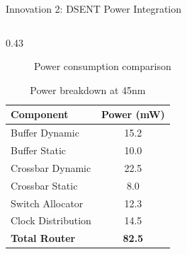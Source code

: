 \documentclass[10pt,aspectratio=169]{beamer}
\begin{document}
\begin{frame}[fragile]{Innovation 2: DSENT Power Integration}
\begin{columns}[T]
\begin{column}{0.43\textwidth}
\begin{figure}
                \caption{Power consumption comparison}
            \end{figure}
            
            \begin{table}[h]
                \centering
                \tiny
                \begin{tabular}{|l|c|}
                    \hline
                    \textbf{Component} & \textbf{Power (mW)} \\
                    \hline
                    Buffer Dynamic & 15.2 \\
                    Buffer Static & 10.0 \\
                    Crossbar Dynamic & 22.5 \\
                    Crossbar Static & 8.0 \\
                    Switch Allocator & 12.3 \\
                    Clock Distribution & 14.5 \\
                    \hline
                    \textbf{Total Router} & \textbf{82.5} \\
                    \hline
                \end{tabular}
                \caption{Power breakdown at 45nm}
            \end{table}
        \end{column}
    \end{columns}
\end{frame}
\end{document}
